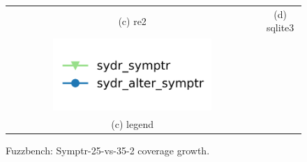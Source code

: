 \begin{figure}[t]
{\begin{tabular}{cc}
            (c) re2                                                                                                        & (d) sqlite3                                                                                                          \\[6pt]
            \includegraphics[width=0.65\textwidth]{assets/fuzzbench/symptr-25-vs-35-2/fuzzbench-legend.png}                &                                                                                                                      \\
            (c) legend                                                                                                     &                                                                                                                      \\[6pt]
        \end{tabular}
    }
    \caption{Fuzzbench: Symptr-25-vs-35-2 coverage growth.}
    \label{fig:fuzzbench:symptr-25-vs-35-2}
\end{figure}


